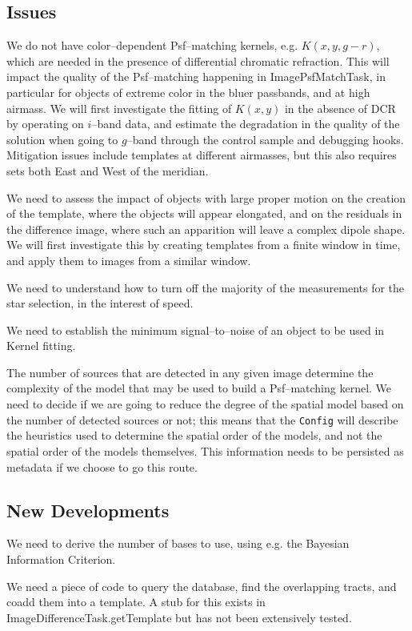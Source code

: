 \documentclass[12pt]{article}
\begin{document}
\subsection{Issues}
We do not have color--dependent Psf--matching kernels,
e.g. $K(x,y,g-r)$, which are needed in the presence of differential
chromatic refraction.  This will impact the quality of the
Psf--matching happening in ImagePsfMatchTask, in particular for
objects of extreme color in the bluer passbands, and at high airmass.
We will first investigate the fitting of $K(x,y)$ in the absence of
DCR by operating on $i$--band data, and estimate the degradation in
the quality of the solution when going to $g$--band through the
control sample and debugging hooks.  Mitigation issues include
templates at different airmasses, but this also requires sets both East
and West of the meridian.

We need to assess the impact of objects with large proper motion on
the creation of the template, where the objects will appear elongated,
and on the residuals in the difference image, where such an apparition
will leave a complex dipole shape.  We will first investigate this by
creating templates from a finite window in time, and apply them to
images from a similar window.

We need to understand how to turn off the majority of the measurements
for the star selection, in the interest of speed.

We need to establish the minimum signal--to--noise of an object to be
used in Kernel fitting.

The number of sources that are detected in any given image determine
the complexity of the model that may be used to build a Psf--matching
kernel.  We need to decide if we are going to reduce the degree of the
spatial model based on the number of detected sources or not; this
means that the {\tt Config} will describe the heuristics used to
determine the spatial order of the models, and not the spatial order
of the models themselves.  This information needs to be persisted as
metadata if we choose to go this route.

\subsection{New Developments}
We need to derive the number of bases to use, using e.g. the Bayesian
Information Criterion.

We need a piece of code to query the database, find the overlapping
tracts, and coadd them into a template.  A stub for this exists in
ImageDifferenceTask.getTemplate but has not been extensively tested.
\end{document}
